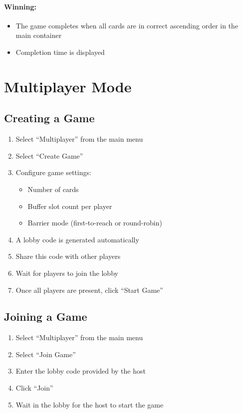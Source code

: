 \paragraph*{Winning:}
\begin{itemize}
    \item The game completes when all cards are in correct ascending order in the main container
    \item Completion time is displayed
\end{itemize}

\section{Multiplayer Mode}
\label{app:a:multiplayer-mode}

\subsection{Creating a Game}

\begin{enumerate}
    \item Select ``Multiplayer'' from the main menu
    \item Select ``Create Game''
    \item Configure game settings:
          \begin{itemize}
              \item Number of cards
              \item Buffer slot count per player
              \item Barrier mode (first-to-reach or round-robin)
          \end{itemize}
    \item A lobby code is generated automatically
    \item Share this code with other players
    \item Wait for players to join the lobby
    \item Once all players are present, click ``Start Game''
\end{enumerate}

\subsection{Joining a Game}

\begin{enumerate}
    \item Select ``Multiplayer'' from the main menu
    \item Select ``Join Game''
    \item Enter the lobby code provided by the host
    \item Click ``Join''
    \item Wait in the lobby for the host to start the game
\end{enumerate}

